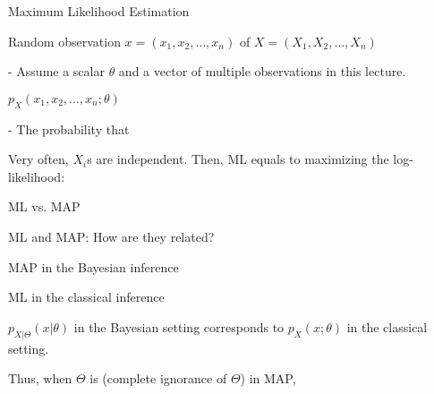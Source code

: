 \begin{frame}{Maximum Likelihood Estimation}

\plitemsep 0.1in

\bci
\item<2-> Random observation $x=(x_1, x_2, \ldots, x_n)$ of $X=(X_1, X_2, \ldots, X_n)$

- Assume a scalar $\theta$ and a vector of multiple observations in this lecture.

\item<3-> 

\bci
\item $p_X(x_1, x_2, \ldots, x_n;\theta)$

\smallskip
  - The probability that 





\item<5-> 



\eci

\item<6-> Very often, $X_i$s are independent. Then, ML equals to maximizing the log-likelihood:

\eci
\end{frame}

\begin{frame}{ML vs. MAP}

\plitemsep 0.1in

\bci
\item<1-> ML and MAP: How are they related?

\item<2-> MAP in the Bayesian inference

\item<3-> ML in the classical inference

\item<4-> $p_{X| \Theta}(x|\theta)$ in the Bayesian setting corresponds to $p_X(x;\theta)$ in the classical setting.

\item<5-> Thus, when $\Theta$ is  (complete ignorance of
  $\Theta$) in MAP, 

\eci
\end{frame}


